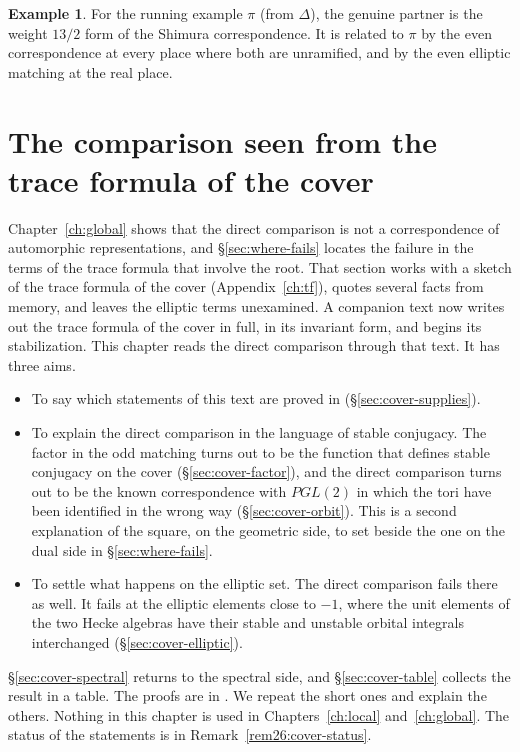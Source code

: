 \documentclass[12pt,letterpaper,openany]{book}
\theoremstyle{plain}
\theoremstyle{definition}
\newtheorem{example}[theorem]{Example}
\theoremstyle{remark}
\theoremstyle{remark}
\begin{document}
\begin{example}
For the running example $\pi$ (from $\Delta$), the genuine partner is the
weight $13/2$ form of the Shimura correspondence. It is related to $\pi$
by the even correspondence at every place where both are unramified, and
by the even elliptic matching at the real place.
\end{example}




\chapter{The comparison seen from the trace formula of the cover}\label{ch:cover}

Chapter~\ref{ch:global} shows that the direct comparison is not a
correspondence of automorphic representations, and \S\ref{sec:where-fails}
locates the failure in the terms of the trace formula that involve the
root. That section works with a sketch of the trace formula of the cover
(Appendix~\ref{ch:tf}), quotes several facts from memory, and leaves the
elliptic terms unexamined. A companion text \cite{JC} now writes out the
trace formula of the cover in full, in its invariant form, and begins its
stabilization. This chapter reads the direct comparison through that
text. It has three aims.
\begin{itemize}
\item To say which statements of this text are proved in \cite{JC}
(\S\ref{sec:cover-supplies}).
\item To explain the direct comparison in the language of stable
conjugacy. The factor in the odd matching turns out to be the function
that defines stable conjugacy on the cover (\S\ref{sec:cover-factor}),
and the direct comparison turns out to be the known correspondence with
$PGL(2)$ in which the tori have been identified in the wrong way
(\S\ref{sec:cover-orbit}). This is a second explanation of the square,
on the geometric side, to set beside the one on the dual side in
\S\ref{sec:where-fails}.
\item To settle what happens on the elliptic set. The direct comparison
fails there as well. It fails at the elliptic elements close to $-1$,
where the unit elements of the two Hecke algebras have their stable and
unstable orbital integrals interchanged (\S\ref{sec:cover-elliptic}).
\end{itemize}
\S\ref{sec:cover-spectral} returns to the spectral side, and
\S\ref{sec:cover-table} collects the result in a table. The proofs are in
\cite[Chapter~8]{JC}. We repeat the short ones and explain the others.
Nothing in this chapter is used in Chapters~\ref{ch:local}
and~\ref{ch:global}. The status of the statements is in
Remark~\ref{rem26:cover-status}.
\end{document}
